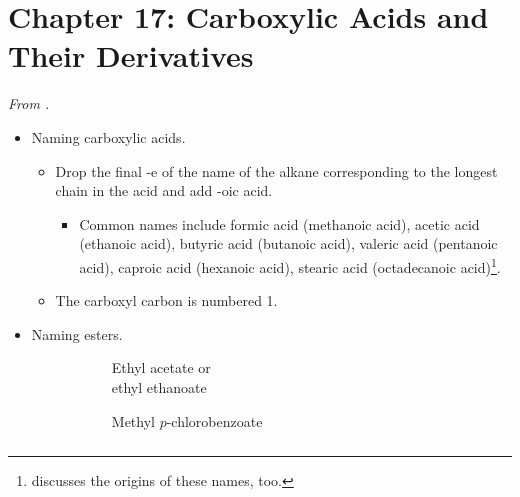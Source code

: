 \documentclass[../notes.tex]{subfiles}
\begin{document}
\section{Chapter 17: Carboxylic Acids and Their Derivatives}
\emph{From \textcite{bib:SolomonsEtAl}.}
\begin{itemize}
    \item Naming carboxylic acids.
    \begin{itemize}
        \item Drop the final -e of the name of the alkane corresponding to the longest chain in the acid and add -oic acid.
        \begin{itemize}
            \item Common names include formic acid (methanoic acid), acetic acid (ethanoic acid), butyric acid (butanoic acid), valeric acid (pentanoic acid), caproic acid (hexanoic acid), stearic acid (octadecanoic acid)\footnote{\textcite{bib:SolomonsEtAl} discusses the origins of these names, too.}.
        \end{itemize}
        \item The carboxyl carbon is numbered 1.
    \end{itemize}
    \item Naming esters.
    \begin{figure}[H]
        \centering
        \footnotesize
        \captionsetup{justification=centering}
        \begin{subfigure}[b]{0.3\linewidth}
            \centering
            \color{blx}
            \caption*{\textcolor{rex}{Ethyl} \textcolor{blx}{acetate} or\\\textcolor{rex}{ethyl} \textcolor{blx}{ethanoate}}
            \label{fig:esterNomenclaturea}
        \end{subfigure}
        \begin{subfigure}[b]{0.3\linewidth}
            \centering
            \color{blx}
            \caption*{\textcolor{rex}{Methyl} \textcolor{grx}{$p$-chloro}\textcolor{blx}{benzoate}\\${\color{white}hi}$}
            \label{fig:esterNomenclatureb}
        \end{subfigure}
        \begin{subfigure}[b]{0.3\linewidth}
            \centering
            \color{blx}

\end{subfigure}
\end{figure}
\end{itemize}
\end{document}
